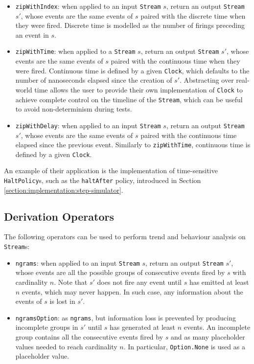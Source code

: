 \begin{itemize}
  \item \texttt{zipWithIndex}: when applied to an input \texttt{Stream} $s$,
        return an output \texttt{Stream} $s'$, whose events are the same events
        of $s$ paired with the discrete time when they were fired. Discrete
        time is modelled as the number of firings preceding an event in $s$.
  \item \texttt{zipWithTime}: when applied to a \texttt{Stream} $s$, return an
        output \texttt{Stream} $s'$, whose events are the same events of $s$
        paired with the continuous time when they were fired. Continuous time
        is defined by a given \texttt{Clock}, which defaults to the number of
        nanoseconds elapsed since the creation of $s'$. Abstracting over
        real-world time allows the user to provide their own implementation of
        \texttt{Clock} to achieve complete control on the timeline of the
        \texttt{Stream}, which can be useful to avoid non-determinism during
        tests.
  \item \texttt{zipWithDelay}: when applied to an input \texttt{Stream} $s$,
        return an output \texttt{Stream} $s'$, whose events are the same events
        of $s$ paired with the continuous time elapsed since the previous
        event. Similarly to \texttt{zipWithTime}, continuous time is defined by
        a given \texttt{Clock}.
\end{itemize}

An example of their application is the implementation of time-sensitive
\texttt{Halt\-Policy}s, such as the \texttt{haltAfter} policy, introduced in
Section \ref{section:implementation:step-simulator}.

\subsection{Derivation Operators}

The following operators can be used to perform trend and behaviour analysis on
\texttt{Stream}s:

\begin{itemize}
  \item \texttt{ngrams}: when applied to an input \texttt{Stream} $s$, return
        an output \texttt{Stream} $s'$, whose events are all the possible
        groups of consecutive events fired by $s$ with cardinality $n$. Note
        that $s'$ does not fire any event until $s$ has emitted at least $n$
        events, which may never happen. In such case, any information about the
        events of $s$ is lost in $s'$.
  \item \texttt{ngramsOption}: as \texttt{ngrams}, but information loss is
        prevented by producing incomplete groups in $s'$ until $s$ has
        generated at least $n$ events. An incomplete group contains all the
        consecutive events fired by $s$ and as many placeholder values needed
        to reach cardinality $n$. In particular, \texttt{Option.None} is used
        as a placeholder value.
\end{itemize}

